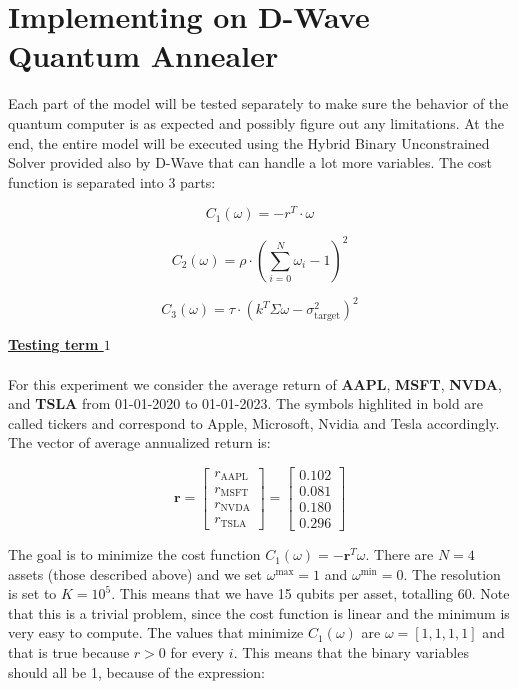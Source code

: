 \documentclass[12pt,a4paper]{report}
\begin{document}
\newpage

\section{Implementing on D-Wave Quantum Annealer}
Each part of the model will be tested separately to make sure the behavior of the quantum computer is as expected and possibly figure out any limitations. At the end, the entire model will be executed using the Hybrid Binary Unconstrained Solver provided also by D-Wave that can handle a lot more variables. The cost function is separated into 3 parts:

\[ C_1(\omega) = -r^T \cdot \omega \]

\[ C_2(\omega) = \rho \cdot \left( \sum_{i=0}^{N} \omega_i - 1 \right)^2 \]

\[ C_3(\omega) = \tau \cdot \left( k^T \Sigma \omega - \sigma_{\text{target}}^2 \right)^2 \]

\noindent
\textbf{\underline{Testing term $1$}}
\\~\\

\noindent
For this experiment we consider the average return of \textbf{AAPL}, \textbf{MSFT}, \textbf{NVDA}, and \textbf{TSLA} from 01-01-2020 to 01-01-2023. The symbols highlited in bold are called tickers and correspond to Apple, Microsoft, Nvidia and Tesla accordingly. The vector of average annualized return is:

\[ \mathbf{r} = 
\begin{bmatrix}
r_{\text{AAPL}} \\
r_{\text{MSFT}} \\
r_{\text{NVDA}} \\
r_{\text{TSLA}}
\end{bmatrix}
=
\begin{bmatrix}
0.102 \\
0.081 \\
0.180 \\
0.296
\end{bmatrix} \]

\noindent
The goal is to minimize the cost function \( C_1(\omega) = -\mathbf{r}^T \omega \). There are \( N = 4 \) assets (those described above) and we set \( \omega^{\text{max}} = 1 \) and \( \omega^{\text{min}} = 0 \). The resolution is set to \( K = 10^5 \). This means that we have 15 qubits per asset, totalling 60. Note that this is a trivial problem, since the cost function is linear and the minimum is very easy to compute. The values that minimize \( C_1(\omega) \) are \( \omega = [1, 1, 1, 1] \) and that is true because \(r>0\) for every \(i\). This means that the binary variables should all be 1, because of the expression:
\end{document}
